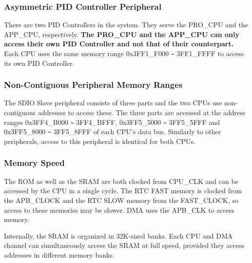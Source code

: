 \documentclass[main\_\_EN.tex]{subfiles}
\begin{document}
\subsubsection{Asymmetric PID Controller Peripheral}

\hypertarget{CPU_Use_PID_Controller}{}
There are two PID Controllers in the system. They serve the PRO\_CPU and the APP\_CPU, respectively. \textbf{The PRO\_CPU and the APP\_CPU can only access their own PID Controller and not that of their counterpart.}
Each CPU uses the same memory range 0x3FF1\_F000 \verb+~+ 3FF1\_FFFF to access its own PID Controller.

\subsubsection{Non-Contiguous Peripheral Memory Ranges}

\hypertarget{SDIO_Slave_split_three_part}{}
The SDIO Slave peripheral consists of three parts and the two CPUs use non-contiguous addresses to access these. The three parts are accessed at the address ranges 0x3FF4\_B000 \verb+~+ 3FF4\_BFFF, 0x3FF5\_5000 \verb+~+ 3FF5\_5FFF and 0x3FF5\_8000 \verb+~+ 3FF5\_8FFF of each CPU's data bus. Similarly to other peripherals, access to this peripheral is identical for both CPUs.


\subsubsection{Memory Speed}
The ROM as well as the SRAM are both clocked from CPU\_CLK and can be accessed by the CPU in a single cycle. The RTC FAST memory is clocked from the APB\_CLOCK and the RTC SLOW memory from the FAST\_CLOCK, so access to these memories may be slower. DMA uses the APB\_CLK to access memory.

Internally, the SRAM is organized in 32K-sized banks. Each CPU and DMA channel can simultaneously access the SRAM at full speed, provided they access addresses in different memory banks.
\end{document}
